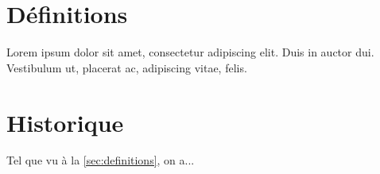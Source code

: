 \documentclass[11pt]{article}
\begin{document}
\section{Définitions}
\label{sec:definitions}

Lorem ipsum dolor sit amet, consectetur adipiscing elit.
Duis in auctor dui. Vestibulum ut, placerat ac, adipiscing
vitae, felis.

\section{Historique}

Tel que vu à la \autoref{sec:definitions}, on a...
\end{document}
